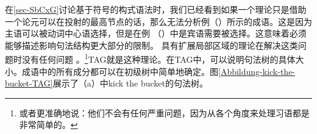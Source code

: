 在\ref{sec-SbCxG}讨论基于符号的构式语法时，我们已经看到如果一个理论只是借助一个论元可以在投射的最高节点的话，那么无法分析例（）所示的成语。这是因为主语可以被动词中心语选择，但是在例 （）中是宾语需要被选择。这意味着必须能够描述影响句法结构更大部分的限制。
\eal
{}
\zl
具有扩展局部区域的理论在解决这类问题时没有任何问题 。\footnote{%
或者更准确地说：他们不会有任何严重问题，因为从各个角度来处理习语都是非常简单的\citep{Sailer2000a}。
}TAG就是这种理论。在TAG中，可以说明句法树的具体大小\citep{Abeille88a,AS89a}。成语中的所有成分都可以在初级树中简单地确定。图\vref{Abbildung-kick-the-bucket-TAG}展示了（a）中kick the bucket的句法树。
